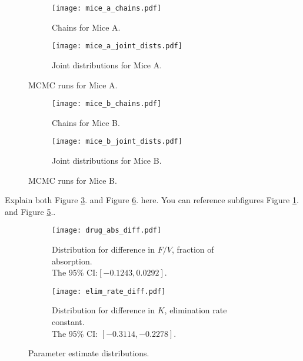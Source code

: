 \documentclass{article}
\newcommand{\figref}[1]{Figure \ref{#1}.}
\begin{document}
\begin{figure}[H]
  \begin{subfigure}[t]{.45\textwidth}
    \texttt{[image: mice\_a\_chains.pdf]} 
    \caption{Chains for Mice A.}
    \label{amcmc:chain}
  \end{subfigure}
  \begin{subfigure}[t]{.45\textwidth}
    \texttt{[image: mice\_a\_joint\_dists.pdf]}
    \caption{Joint distributions for Mice A.}
    \label{amcmc:dists}
  \end{subfigure}
  \caption{MCMC runs for Mice A.}
  \label{amcmc}
\end{figure}

\begin{figure}[H]
  \begin{subfigure}[t]{.45\textwidth}
    \texttt{[image: mice\_b\_chains.pdf]} 
    \caption{Chains for Mice B.}
    \label{bmcmc:chain}
  \end{subfigure}
  \begin{subfigure}[t]{.45\textwidth}
    \texttt{[image: mice\_b\_joint\_dists.pdf]}
    \caption{Joint distributions for Mice B.}
    \label{bmcmc:dists}
  \end{subfigure}
  \caption{MCMC runs for Mice B.}
  \label{bmcmc}
\end{figure}

Explain both \figref{amcmc} and \figref{bmcmc} here.  You can reference subfigures \figref{amcmc:chain} and \figref{bmcmc:dists}.

\begin{figure}[H]
  \begin{subfigure}[b]{.45\textwidth}
    \texttt{[image: drug\_abs\_diff.pdf]} 
    \caption{Distribution for difference in $F/V$, fraction of absorption. \\
    The 95\% CI:$[-0.1243,0.0292].$}
     
    \label{absorp}
  \end{subfigure}
  \begin{subfigure}[b]{.45\textwidth}
    \texttt{[image: elim\_rate\_diff.pdf]}
    \caption{Distribution for difference in $K$, elimination rate constant.\\
    The 95\% CI: $[-0.3114,   -0.2278].$}
      
    \label{elim}
  \end{subfigure}
  \caption{ Parameter estimate distributions. }

\end{figure}
\end{document}
